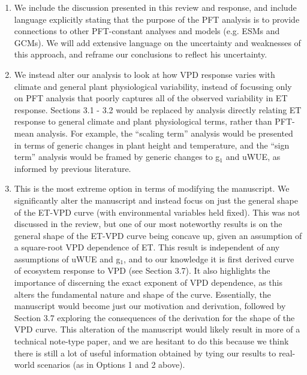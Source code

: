 \begin{enumerate}
\item We include the discussion presented in this review and response,
  and include language explicitly stating that the purpose of the PFT
  analysis is to provide connections to other PFT-constant analyses
  and models (e.g. ESMs and GCMs). We will add extensive language on
  the uncertainty and weaknesses of this approach, and reframe our
  conclusions to reflect his uncertainty.
\item We instead alter our analysis to look at how VPD response varies
  with climate and general plant physiological variability, instead of
  focussing only on PFT analysis that poorly captures all of the observed
  variability in ET response. Sections 3.1 - 3.2 would be replaced by
  analysis directly relating ET response to general climate and plant
  physiological terms, rather than PFT-mean analysis. For example, the
  ``scaling term'' analysis would be presented in terms of generic
  changes in plant height and temperature, and the ``sign term''
  analysis would be framed by generic changes to g$_1$ and uWUE, as
  informed by previous literature.
\item This is the most extreme option in terms of modifying the
  manuscript. We significantly alter the manuscript and instead focus
  on just the general shape of the ET-VPD curve (with environmental
  variables held fixed). This was not discussed in the review, but one
  of our most noteworthy results is on the general shape of the ET-VPD
  curve being concave up, given an assumption of a square-root VPD
  dependence of ET. This result is independent of any assumptions of
  uWUE and g$_1$, and to our knowledge it is first derived curve of
  ecosystem response to VPD (see Section 3.7). It also highlights the
  importance of discerning the exact exponent of VPD dependence, as
  this alters the fundamental nature and shape of the
  curve. Essentially, the manuscript would become just our motivation
  and derivation, followed by Section 3.7 exploring the consequences
  of the derivation for the shape of the VPD curve. This alteration of
  the manuscript would likely result in more of a technical note-type
  paper, and we are hesitant to do this because we think there is
  still a lot of useful information obtained by tying our results to
  real-world scenarios (as in Options 1 and 2 above).
\end{enumerate}

